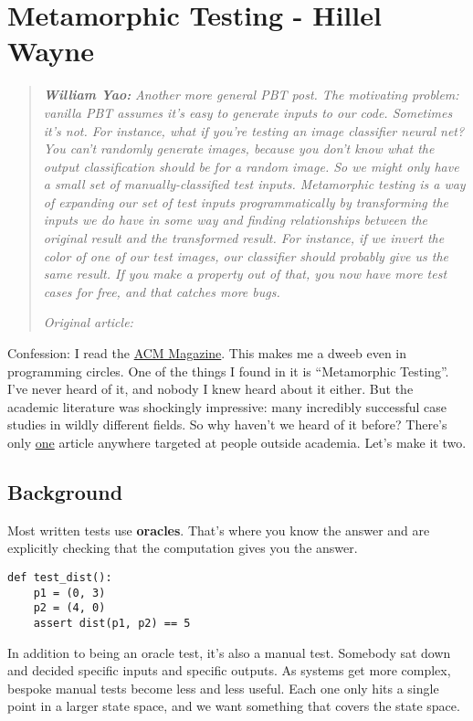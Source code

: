 \chapter{Metamorphic Testing - Hillel Wayne}


\begin{quotation}
\noindent\textit{\textbf{William Yao:}}
\textit{Another more general PBT post. The motivating problem: vanilla PBT assumes it's easy to generate inputs to our code. Sometimes it's not. For instance, what if you're testing an image classifier neural net? You can't randomly generate images, because you don't know what the output classification should be for a random image. So we might only have a small set of manually-classified test inputs. Metamorphic testing is a way of expanding our set of test inputs programmatically by transforming the inputs we do have in some way and finding relationships between the original result and the transformed result. For instance, if we invert the color of one of our test images, our classifier should probably give us the same result. If you make a property out of that, you now have more test cases for free, and that catches more bugs.}

\vspace{\baselineskip}
\noindent\textit{Original article: \cite{metamorphic_testing}}
\end{quotation}



\noindent Confession: I read the \href{https://queue.acm.org/}{ACM Magazine}. This
makes me a dweeb even in programming circles. One of the things I found
in it is ``Metamorphic Testing''. I've never heard of it, and nobody I
knew heard about it either. But the academic literature was shockingly
impressive: many incredibly successful case studies in wildly different
fields. So why haven't we heard of it before? There's only
\href{https://medium.com/trustableai/testing-ai-with-metamorphic-testing-61d690001f5c}{one}
article anywhere targeted at people outside academia. Let's make it two.

\section{Background}\label{background}

Most written tests use \textbf{oracles}. That's where you know the
answer and are explicitly checking that the computation gives you the
answer.

\begin{verbatim}
def test_dist():
    p1 = (0, 3)
    p2 = (4, 0)
    assert dist(p1, p2) == 5
\end{verbatim}
In addition to being an oracle test, it's also a manual test. Somebody
sat down and decided specific inputs and specific outputs. As systems
get more complex, bespoke manual tests become less and less useful. Each
one only hits a single point in a larger state space, and we want
something that covers the state space.

